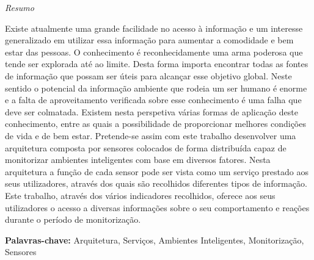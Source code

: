 \documentclass[a4paper, 12pt, oneside]{Thesis}  %
\begin{document}
\vspace*{\fill}

\newpage


\begin{center}
{\large \textit{Resumo} }
\end{center}


\vspace{0.5cm}
\quad Existe atualmente uma grande facilidade no acesso à informação e um interesse generalizado em utilizar essa informação para aumentar a comodidade e bem estar das pessoas. O conhecimento é reconhecidamente uma arma poderosa que tende ser explorada até ao limite. Desta forma importa encontrar todas as fontes de informação que possam ser úteis para alcançar esse objetivo global. Neste sentido o potencial da informação ambiente que rodeia um ser humano é enorme e a falta de aproveitamento verificada sobre esse conhecimento é uma falha que deve ser colmatada. Existem nesta perspetiva várias formas de aplicação deste conhecimento, entre as quais a possibilidade de proporcionar melhores condições de vida e de bem estar. Pretende-se assim com este trabalho desenvolver uma arquitetura composta por sensores colocados de forma distribuída capaz de monitorizar ambientes inteligentes com base em diversos fatores. Nesta arquitetura a função de cada sensor pode ser vista como um serviço prestado aos seus utilizadores, através dos quais são recolhidos diferentes tipos de informação. Este trabalho, através dos vários indicadores recolhidos, oferece aos seus utilizadores o acesso a diversas informações sobre o seu comportamento e reações durante o período de monitorização.

\vspace{3cm}

\textbf{Palavras-chave:} Arquitetura, Serviços, Ambientes Inteligentes, Monitorização, Sensores




\newpage
\thispagestyle{empty}
\mbox{}


\newpage
\thispagestyle{empty}
\mbox{}
\end{document}
